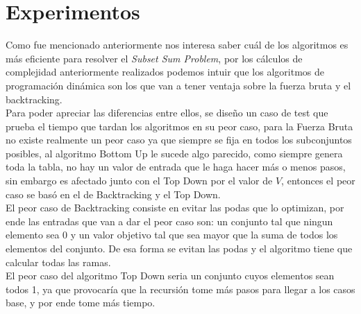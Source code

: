 \documentclass[a4paper]{article}
\begin{document}
\pagebreak

\section{Experimentos}

Como fue mencionado anteriormente nos interesa saber cuál de los algoritmos es más eficiente para resolver el \textit{Subset Sum Problem}, por los cálculos de complejidad anteriormente realizados podemos intuir que los algoritmos de programación dinámica son los que van a tener ventaja sobre la fuerza bruta y el backtracking.
\\
Para poder apreciar las diferencias entre ellos, se diseño un caso de test que prueba el tiempo que tardan los algoritmos en su peor caso, para la Fuerza Bruta no existe realmente un peor caso ya que siempre se fija en todos los subconjuntos posibles, al algoritmo Bottom Up le sucede algo parecido, como siempre genera toda la tabla, no hay un valor de entrada que le haga hacer más o menos pasos, sin embargo es afectado junto con el Top Down por el valor de $V$, entonces el peor caso se basó en el de Backtracking y el Top Down. 
\\
El peor caso de Backtracking consiste en evitar las podas que lo optimizan, por ende las entradas que van a dar el peor caso son: un conjunto tal que ningun elemento sea 0 y un valor objetivo tal que sea mayor que la suma de todos los elementos del conjunto. De esa forma se evitan las podas y el algoritmo tiene que calcular todas las ramas.
\\
El peor caso del algoritmo Top Down seria un conjunto cuyos elementos sean todos 1, ya que provocaría que la recursión tome más pasos para llegar a los casos base, y por ende tome más tiempo.
\\
\end{document}

